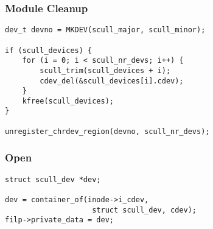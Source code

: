 \documentclass[dvipsnames]{beamer}
\begin{document}
\begin{frame}[fragile]
  \frametitle{Module Cleanup}

  \begin{exampleblock}{}
    \begin{lstlisting}
dev_t devno = MKDEV(scull_major, scull_minor);

if (scull_devices) {
    for (i = 0; i < scull_nr_devs; i++) {
        scull_trim(scull_devices + i);
        cdev_del(&scull_devices[i].cdev);
    }
    kfree(scull_devices);
}

unregister_chrdev_region(devno, scull_nr_devs);
    \end{lstlisting}
  \end{exampleblock}
\end{frame}
%
%

\begin{frame}[fragile]
  \frametitle{Open}

  \begin{exampleblock}{}
    \begin{lstlisting}
struct scull_dev *dev;

dev = container_of(inode->i_cdev,
                    struct scull_dev, cdev);
filp->private_data = dev;
    \end{lstlisting}
  \end{exampleblock}
\end{frame}
%
%
\end{document}
